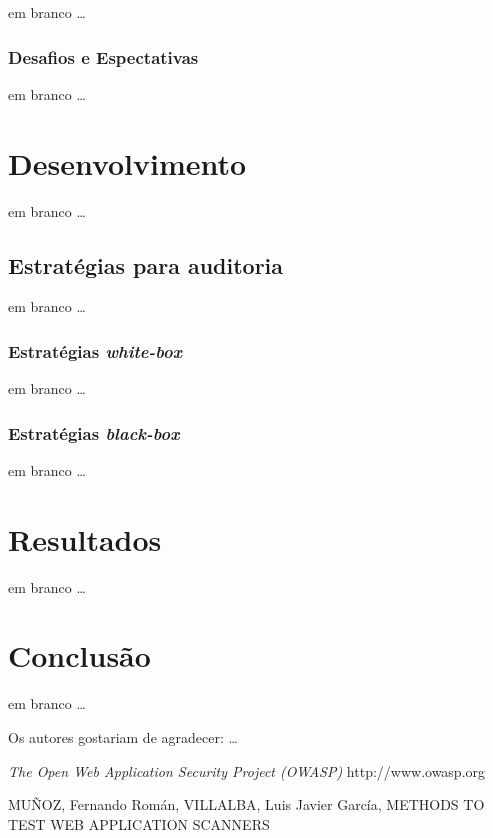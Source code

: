 \documentclass[twocolumn,showpacs,%
  nofootinbib,aps,superscriptaddress,%
  eqsecnum,prd,notitlepage,showkeys,10pt]{revtex4-1}
\begin{document}
em branco \dots

\subsubsection{Desafios e Espectativas}

em branco \dots

\section{Desenvolvimento}
\label{sec:desenv}

em branco \dots

\subsection{Estratégias para auditoria}

em branco \dots

\subsubsection{Estratégias \emph{white-box}}

em branco \dots

\subsubsection{Estratégias \emph{black-box}}

em branco \dots

\section{Resultados}
\label{sec:resultados}

em branco \dots

\section{Conclusão}
\label{sec:conclusao}

em branco \dots


\begin{acknowledgments}

Os autores gostariam de agradecer:\cite{owasp2013} \dots

\end{acknowledgments}

\begin{thebibliography}{99}

  \emph{The Open Web Application Security Project (OWASP)}
  http://www.owasp.org

  MUÑOZ, Fernando Román, VILLALBA, Luis Javier García, METHODS TO TEST WEB APPLICATION SCANNERS
  
  
\end{thebibliography}
\end{document}

